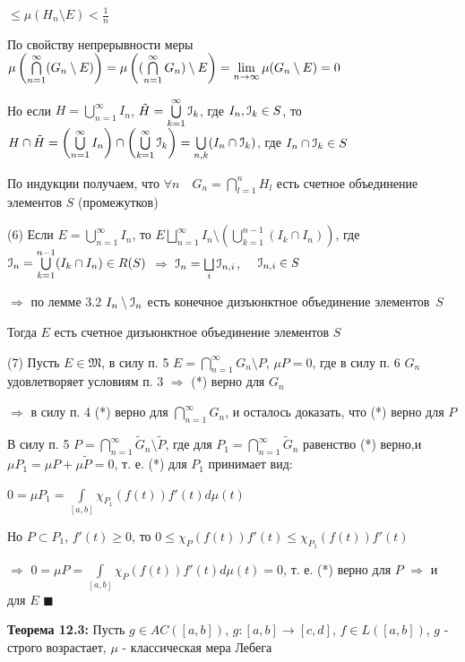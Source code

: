 \documentclass[a4paper]{report}
\newcommand*{\hm}[1]{#1\nobreak\discretionary{}%
            {\hbox{$\mathsurround=0pt #1$}}{}}
\begin{document}
\noindent$\le\mu(H_n\setminus E)<\frac1n$

По свойству непрерывности меры $\mu\left(\bigcap\limits_{n=1}^\infty(G_n\setminus E)\right)=\mu\left((\bigcap\limits_{n=1}^\infty G_n)\setminus E\right)\hm=\lim\limits_{n\to\infty}\mu(G_n\setminus E)=0$

Но если $H=\bigcup\limits_{n=1}^\infty I_n$, $\tilde H=\bigcup\limits_{k=1}^\infty \EuScript I_k$, где $I_n,\EuScript I_k\in S$, то $H\cap\tilde H=\left(\bigcup\limits_{n=1}^\infty I_n\right)\hm\cap\left(\bigcup\limits_{k=1}^\infty\EuScript I_k\right)=\bigcup\limits_{n,k}(I_n\cap\EuScript I_k)$, где $I_n\cap\EuScript I_k\in S$

По индукции получаем, что $\forall n\quad G_n=\bigcap\limits_{l=1}^n H_l$ есть счетное объединение элементов $S$ (промежутков)

(6) Если $E=\bigcup\limits_{n=1}^\infty I_n$, то $E\bigsqcup\limits_{n=1}^\infty I_n\setminus\left(\bigcup\limits_{k=1}^{n-1}(I_k\cap I_n)\right)$, где $\EuScript I_n=\bigcup\limits_{k=1}^{n-1}(I_k\cap I_n)\hm\in R(S)$ $\Rightarrow$ $\EuScript I_n=\bigsqcup\limits_i\EuScript I_{n,i}$, $\quad\EuScript I_{n,i}\in S$

\noindent $\Rightarrow$ по лемме 3.2 $I_n\setminus\EuScript I_n$ есть конечное дизъюнктное объединение \mbox{элементов $S$}

Тогда $E$ есть счетное дизъюнктное объединение элементов $S$
\smallskip

(7) Пусть $E\in\mathfrak M$, в силу п. 5 $E=\bigcap\limits_{n=1}^\infty G_n\setminus P$, $\mu P=0$, где в силу п. 6 $G_n$ удовлетворяет условиям п. 3 $\Rightarrow$ 
(*) верно для $G_n$

$\Rightarrow$ в силу п. 4 (*) верно для $\bigcap\limits_{n=1}^\infty G_n$, и осталось доказать, что (*) верно для $P$

В силу п. 5 $P=\bigcap\limits_{n=1}^\infty\tilde G_n\setminus\tilde P$, где для $P_1=\bigcap\limits_{n=1}^\infty\tilde G_n$ равенство (*) верно,и $\mu P_1=\mu P+\mu 
\tilde P=0$, т. е. (*) для $P_1$ принимает вид:

$0=\mu P_1=\displaystyle\int\limits_{[a,b]}\chi_{P_1}(f(t))f'(t)d\mu(t)$

Но $P\subset P_1$, $f'(t)\ge0$, то $0\le\chi_P(f(t))f'(t)\le\chi_{P_1}(f(t))f'(t)$

\noindent $\Rightarrow$ $0=\mu P=\displaystyle\int\limits_{[a,b]}\chi_P(f(t))f'(t)d\mu(t)=0$, т. е. (*) верно для $P$ $\Rightarrow$ и для $E$ $\blacksquare$
\bigskip

\noindent\textbf{Теорема 12.3:} Пусть $g\in AC([a,b])$, $g\colon[a,b]\to[c,d]$, $f\in L([a,b])$, $g$ - строго возрастает, $\mu$ - классическая мера Лебега
\end{document}
